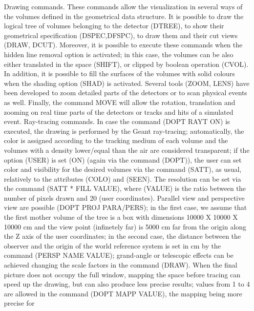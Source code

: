 \ENDCMD
\newpage
{}
\ifMENUtext
   \par
Drawing commands. These commands allow the visualization in several ways of 
   the volumes defined in the geometrical data structure. It is possible to 
   draw the logical tree of volumes belonging to the detector (DTREE), to show 
   their geometrical specification (DSPEC,DFSPC), to draw them and their cut 
   views (DRAW, DCUT). Moreover, it is possible to execute these commands when 
   the hidden line removal option is activated; in this case, the volumes can 
   be also either translated in the space (SHIFT), or clipped by boolean 
   operation (CVOL). In addition, it is possible to fill the surfaces of the 
   volumes with solid colours when the shading option (SHAD) is activated.  
   Several tools (ZOOM, LENS) have been developed to zoom detailed parts of 
   the detectors or to scan physical events as well.  Finally, the command 
   MOVE will allow the rotation, translation and zooming on real time parts of 
   the detectors or tracks and hits of a simulated event.  Ray-tracing 
   commands. In case the command (DOPT RAYT ON) is executed, the drawing is 
   performed by the Geant ray-tracing; automatically, the color is assigned 
   according to the tracking medium of each volume and the volumes with a 
   density lower/equal than the air are considered transparent; if the option 
   (USER) is set (ON) (again via the command (DOPT)), the user can set color 
   and visibility for the desired volumes via the command (SATT), as usual, 
   relatively to the attributes (COLO) and (SEEN).  The resolution can be set 
   via the command (SATT * FILL VALUE), where (VALUE) is the ratio between the 
   number of pixels drawn and 20 (user coordinates).  Parallel view and 
   perspective view are possible (DOPT PROJ PARA/PERS); in the first case, we 
   assume that the first mother volume of the tree is a box with dimensions 
   10000 X 10000 X 10000 cm and the view point (infinetely far) is 5000 cm far 
   from the origin along the Z axis of the user coordinates; in the second 
   case, the distance between the observer and the origin of the world 
   reference system is set in cm by the command (PERSP NAME VALUE); 
   grand-angle or telescopic effects can be achieved changing the scale 
   factors in the command (DRAW). When the final picture does not occupy the 
   full window, mapping the space before tracing can speed up the drawing, but 
   can also produce less precise results; values from 1 to 4 are allowed in 
   the command (DOPT MAPP VALUE), the mapping being more precise for 

